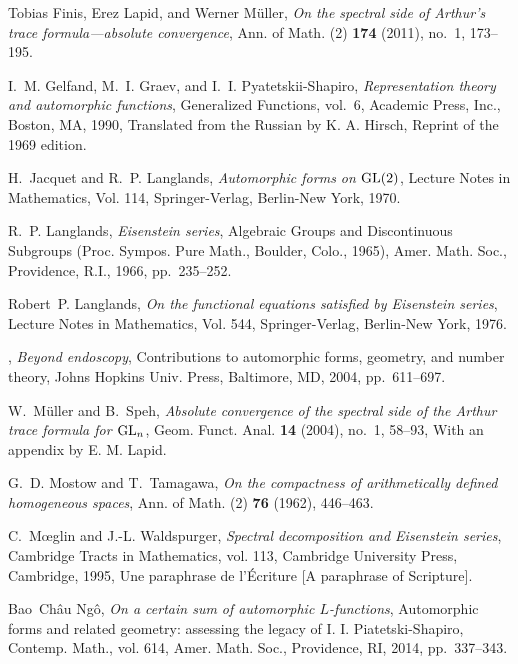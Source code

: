 \documentclass{ims9x6}
\begin{document}
\begin{thebibliography}{}
Tobias Finis, Erez Lapid, and Werner M{\"{u}}ller, \emph{On the spectral side
  of {A}rthur's trace formula---absolute convergence}, Ann. of Math. (2)
  \textbf{174} (2011), no.~1, 173--195. 

I.~M. Gelfand, M.~I. Graev, and I.~I. Pyatetskii-Shapiro, \emph{Representation
  theory and automorphic functions}, Generalized Functions, vol.~6, Academic
  Press, Inc., Boston, MA, 1990, Translated from the Russian by K. A. Hirsch,
  Reprint of the 1969 edition. 

H.~Jacquet and R.~P. Langlands, \emph{Automorphic forms on {${\rm GL}(2)$}},
  Lecture Notes in Mathematics, Vol. 114, Springer-Verlag, Berlin-New York,
  1970. 

R.~P. Langlands, \emph{Eisenstein series}, Algebraic {G}roups and
  {D}iscontinuous {S}ubgroups ({P}roc. {S}ympos. {P}ure {M}ath., {B}oulder,
  {C}olo., 1965), Amer. Math. Soc., Providence, R.I., 1966, pp.~235--252.

Robert~P. Langlands, \emph{On the functional equations satisfied by
  {E}isenstein series}, Lecture Notes in Mathematics, Vol. 544,
  Springer-Verlag, Berlin-New York, 1976. 

\bysame, \emph{Beyond endoscopy}, Contributions to automorphic forms, geometry,
  and number theory, Johns Hopkins Univ. Press, Baltimore, MD, 2004,
  pp.~611--697. 

W.~M{\"{u}}ller and B.~Speh, \emph{Absolute convergence of the spectral side of
  the {A}rthur trace formula for {${\rm GL}_n$}}, Geom. Funct. Anal.
  \textbf{14} (2004), no.~1, 58--93, With an appendix by E. M. Lapid.

G.~D. Mostow and T.~Tamagawa, \emph{On the compactness of arithmetically
  defined homogeneous spaces}, Ann. of Math. (2) \textbf{76} (1962), 446--463.

C.~M{\oe}glin and J.-L. Waldspurger, \emph{Spectral decomposition and
  {E}isenstein series}, Cambridge Tracts in Mathematics, vol. 113, Cambridge
  University Press, Cambridge, 1995, Une paraphrase de l'\'{E}criture [A
  paraphrase of Scripture]. 

Bao~Ch\^{a}u Ng{\^{o}}, \emph{On a certain sum of automorphic {$L$}-functions},
  Automorphic forms and related geometry: assessing the legacy of {I}. {I}.
  {P}iatetski-{S}hapiro, Contemp. Math., vol. 614, Amer. Math. Soc.,
  Providence, RI, 2014, pp.~337--343. 


\end{thebibliography}
\end{document}
